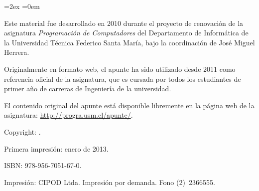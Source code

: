 \thispagestyle{empty}
\begin{minipage}[B]{\textwidth}
  \footnotesize
  \parskip=2ex
  \parindent=0em

  \vspace{100ex}

  Este material fue desarrollado en 2010
  durante el proyecto de renovación de la asignatura
  \emph{Programación de Computadores}
  del Departamento de Informática
  de la Universidad Técnica Federico Santa María,
  bajo la coordinación de José Miguel Herrera.

  Originalmente en formato web,
  el apunte ha sido utilizado desde 2011
  como referencia oficial de la asignatura,
  que es cursada por todos los estudiantes de primer año
  de carreras de Ingeniería de la universidad.

  El contenido original del apunte está disponible libremente
  en la página web de la asignatura:
  \url{http://progra.usm.cl/apunte/}.

  Copyright:  .

  Primera impresión: enero de 2013.

  ISBN: 978-956-7051-67-0.

  Impresión: CIPOD Ltda. Impresión por demanda. Fono (2)~2366555.
\end{minipage}


